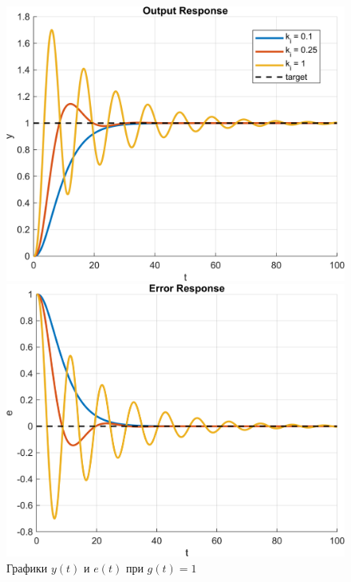 \begin{figure}[H]
    \centering
    \begin{minipage}{0.45\textwidth}
        \centering
        \includegraphics[width=1\textwidth, trim={1cm 0cm 1cm 0cm}]{../images/4_1.png}
    \end{minipage}
    \hfill
    \begin{minipage}{0.45\textwidth}
        \centering
        \includegraphics[width=1\textwidth, trim={1cm 0cm 1cm 0cm}]{../images/4_2.png}
    \end{minipage}
    \caption{Графики $y(t)$ и $e(t)$ при $g(t) = 1$}
\end{figure}

